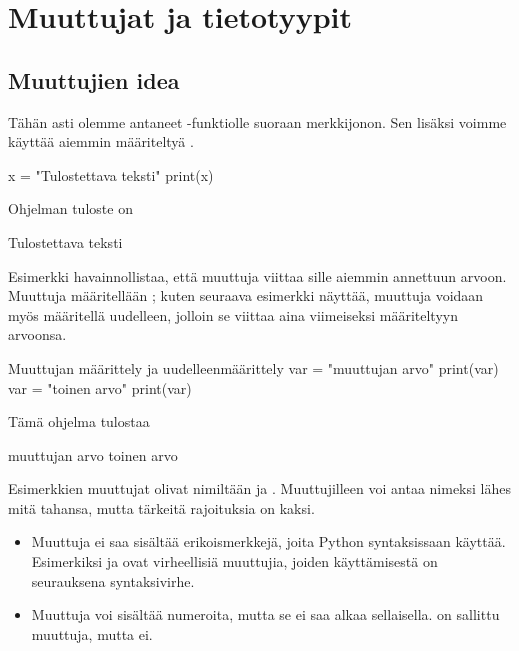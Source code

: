 \chapter{Muuttujat ja tietotyypit}

\section{Muuttujien idea}

Tähän asti olemme antaneet -funktiolle suoraan merkkijonon. Sen lisäksi voimme käyttää aiemmin määriteltyä .

\begin{python}
x = "Tulostettava teksti"
print(x)
\end{python}

Ohjelman tuloste on

\begin{output}
Tulostettava teksti
\end{output}

Esimerkki havainnollistaa, että muuttuja viittaa sille aiemmin annettuun arvoon. Muuttuja määritellään ; kuten seuraava esimerkki näyttää, muuttuja voidaan myös määritellä uudelleen, jolloin se viittaa aina viimeiseksi määriteltyyn arvoonsa.

\begin{example}{Muuttujan määrittely ja uudelleenmäärittely}
var = "muuttujan arvo"
print(var)
var = "toinen arvo"
print(var)
\end{example}

Tämä ohjelma tulostaa

\begin{output}
muuttujan arvo
toinen arvo
\end{output}

Esimerkkien muuttujat olivat nimiltään  ja . Muuttujilleen voi antaa nimeksi lähes mitä tahansa, mutta tärkeitä rajoituksia on kaksi.

\begin{itemize}
\item Muuttuja ei saa sisältää erikoismerkkejä, joita Python syntaksissaan käyttää. Esimerkiksi  ja  ovat virheellisiä muuttujia, joiden käyttämisestä on seurauksena syntaksivirhe.
\item Muuttuja voi sisältää numeroita, mutta se ei saa alkaa sellaisella.  on sallittu muuttuja, mutta  ei.
\end{itemize}

